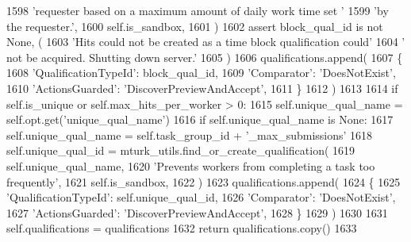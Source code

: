 \begin{DoxyCode}
1598                 \textcolor{stringliteral}{'requester based on a maximum amount of daily work time set '}
1599                 \textcolor{stringliteral}{'by the requester.'},
1600                 self.is\_sandbox,
1601             )
1602             \textcolor{keyword}{assert} block\_qual\_id \textcolor{keywordflow}{is} \textcolor{keywordflow}{not} \textcolor{keywordtype}{None}, (
1603                 \textcolor{stringliteral}{'Hits could not be created as a time block qualification could'}
1604                 \textcolor{stringliteral}{' not be acquired. Shutting down server.'}
1605             )
1606             qualifications.append(
1607                 \{
1608                     \textcolor{stringliteral}{'QualificationTypeId'}: block\_qual\_id,
1609                     \textcolor{stringliteral}{'Comparator'}: \textcolor{stringliteral}{'DoesNotExist'},
1610                     \textcolor{stringliteral}{'ActionsGuarded'}: \textcolor{stringliteral}{'DiscoverPreviewAndAccept'},
1611                 \}
1612             )
1613 
1614         \textcolor{keywordflow}{if} self.is\_unique \textcolor{keywordflow}{or} self.max\_hits\_per\_worker > 0:
1615             self.unique\_qual\_name = self.opt.get(\textcolor{stringliteral}{'unique\_qual\_name'})
1616             \textcolor{keywordflow}{if} self.unique\_qual\_name \textcolor{keywordflow}{is} \textcolor{keywordtype}{None}:
1617                 self.unique\_qual\_name = self.task\_group\_id + \textcolor{stringliteral}{'\_max\_submissions'}
1618             self.unique\_qual\_id = mturk\_utils.find\_or\_create\_qualification(
1619                 self.unique\_qual\_name,
1620                 \textcolor{stringliteral}{'Prevents workers from completing a task too frequently'},
1621                 self.is\_sandbox,
1622             )
1623             qualifications.append(
1624                 \{
1625                     \textcolor{stringliteral}{'QualificationTypeId'}: self.unique\_qual\_id,
1626                     \textcolor{stringliteral}{'Comparator'}: \textcolor{stringliteral}{'DoesNotExist'},
1627                     \textcolor{stringliteral}{'ActionsGuarded'}: \textcolor{stringliteral}{'DiscoverPreviewAndAccept'},
1628                 \}
1629             )
1630 
1631         self.qualifications = qualifications
1632         \textcolor{keywordflow}{return} qualifications.copy()
1633 
\end{DoxyCode}
\mbox{\label{classparlai_1_1mturk_1_1core_1_1legacy__2018_1_1mturk__manager_1_1MTurkManager_a2c9bda32f8ee3b93351dd17cb5392131}} 
